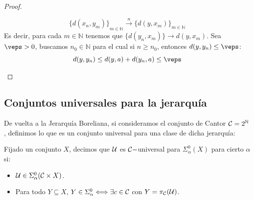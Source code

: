 \begin{teo}
\begin{proof}
\begin{itemize}
                \begin{equation*}
                    {\{d(x_n,y_m)\}}_{m\in \mathbb{N}} \stackrel{n}{\to} {\{d(y,x_m)\}}_{m\in \mathbb{N}}
                \end{equation*}
                Es decir, para cada $m\in \mathbb{N}$ tenemos que $\{d(y_n,x_m)\} \to d(y,x_m)$. Sea $\veps > 0$, buscamos $n_0\in \mathbb{N}$ para el cual si $n\geq n_0$, entonces $d(y,y_n) \leq \veps$:
                \begin{equation*}
                    d(y,y_n) \leq d(y,a) + d(y_n,a) \leq \veps
                \end{equation*}
        \end{itemize}
    \end{proof}
\end{teo}

\subsection{Conjuntos universales para la jerarquía}
De vuelta a la Jerarquía Boreliana, si consideramos el conjunto de Cantor $\mathcal{C} = 2^{\mathbb{N}}$, definimos lo que es un conjunto universal para una clase de dicha jerarquía:
\begin{definicion}
    Fijado un conjunto $X$, decimos que $\mathcal{U}$ es $\mathcal{C}-$universal para $\Sigma^0_\alpha(X)$ para cierto $\alpha$ si:
    \begin{itemize}
        \item $\mathcal{U}\in \Sigma^0_\alpha(\mathcal{C}\times X)$.
        \item Para todo $Y\subseteq X$, $Y\in \Sigma^0_\alpha \Longleftrightarrow \exists c\in \mathcal{C} $ con $Y = \pi_{\mathcal{C}}(\mathcal{U})$.
    \end{itemize}
\end{definicion}

